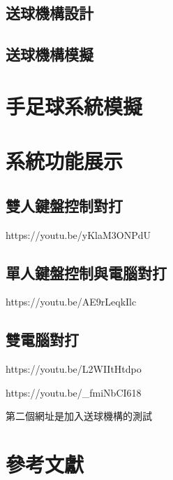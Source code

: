 \documentclass[12pt,,]{report}
\begin{document}
\hypertarget{ux9001ux7403ux6a5fux69cbux8a2dux8a08}{%
\section{送球機構設計}\label{ux9001ux7403ux6a5fux69cbux8a2dux8a08}}

\hypertarget{ux9001ux7403ux6a5fux69cbux6a21ux64ec}{%
\section{送球機構模擬}\label{ux9001ux7403ux6a5fux69cbux6a21ux64ec}}

\hypertarget{ux624bux8db3ux7403ux7cfbux7d71ux6a21ux64ec}{%
\chapter{手足球系統模擬}\label{ux624bux8db3ux7403ux7cfbux7d71ux6a21ux64ec}}

\hypertarget{ux7cfbux7d71ux529fux80fdux5c55ux793a}{%
\chapter{系統功能展示}\label{ux7cfbux7d71ux529fux80fdux5c55ux793a}}

\hypertarget{ux96d9ux4ebaux9375ux76e4ux63a7ux5236ux5c0dux6253}{%
\section{雙人鍵盤控制對打}\label{ux96d9ux4ebaux9375ux76e4ux63a7ux5236ux5c0dux6253}}

https://youtu.be/yKlaM3ONPdU

\hypertarget{ux55aeux4ebaux9375ux76e4ux63a7ux5236ux8207ux96fbux8166ux5c0dux6253}{%
\section{單人鍵盤控制與電腦對打}\label{ux55aeux4ebaux9375ux76e4ux63a7ux5236ux8207ux96fbux8166ux5c0dux6253}}

https://youtu.be/AE9rLeqkIlc

\hypertarget{ux96d9ux96fbux8166ux5c0dux6253}{%
\section{雙電腦對打}\label{ux96d9ux96fbux8166ux5c0dux6253}}

https://youtu.be/L2WIItHtdpo

https://youtu.be/\_fmiNbCI618

第二個網址是加入送球機構的測試

\hypertarget{ux53c3ux8003ux6587ux737b}{%
\chapter{參考文獻}\label{ux53c3ux8003ux6587ux737b}}
\end{document}
